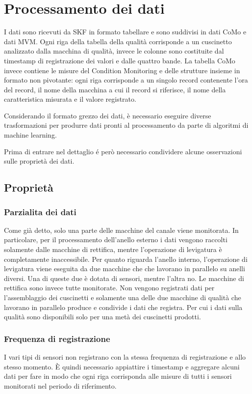 \section{Processamento dei dati}
I dati sono ricevuti da SKF in formato tabellare e sono suddivisi in dati CoMo e dati MVM. Ogni riga della tabella della qualità corrisponde a un cuscinetto analizzato dalla macchina di qualità, invece le colonne sono costituite dal timestamp di registrazione dei valori e dalle quattro bande.
La tabella CoMo invece contiene le misure del Condition Monitoring e delle strutture insieme in formato non pivotante: ogni riga corrisponde a un singolo record contenente l'ora del record, il nome della macchina a cui il record si riferisce, il nome della caratteristica misurata e il valore registrato.

Considerando il formato grezzo dei dati, è necessario eseguire diverse trasformazioni per produrre dati pronti al processamento da parte di algoritmi di machine learning. 

Prima di entrare nel dettaglio é però necessario condividere alcune osservazioni sulle proprietà dei dati.

\subsection{Proprietà}

\subsubsection{Parzialita dei dati}
Come già detto, solo una parte delle macchine del canale viene monitorata.
In particolare, per il processamento dell'anello esterno i dati vengono raccolti solamente dalle macchine di rettifica, mentre l'operazione di levigatura è completamente inaccessibile.
Per quanto riguarda l'anello interno, l'operazione di levigatura viene eseguita da due macchine che che lavorano in parallelo su anelli diversi. Una di queste due è dotata di sensori, mentre l'altra no. Le macchine di rettifica sono invece tutte monitorate.
Non vengono registrati dati per l'assemblaggio dei cuscinetti e solamente una delle due macchine di qualità che lavorano in parallelo produce e condivide i dati che registra. Per cui i dati sulla qualità sono disponibili solo per una metà dei cuscinetti prodotti.

\subsubsection{Frequenza di registrazione}
I vari tipi di sensori non registrano con la stessa frequenza di registrazione e allo stesso momento.
È quindi necessario appiattire i timestamp e aggregare alcuni dati per fare in modo che ogni riga corrisponda alle misure di tutti i sensori monitorati nel periodo di riferimento.


